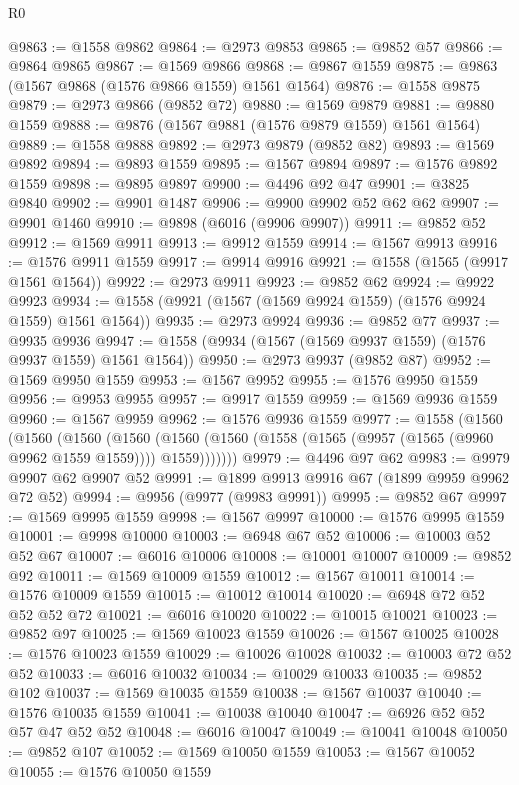 \begin{lexlean}{R0}
\begin{coremodule}
@9863 := @1558 @9862
@9864 := @2973 @9853
@9865 := @9852 @57
@9866 := @9864 @9865
@9867 := @1569 @9866
@9868 := @9867 @1559
@9875 := @9863 (@1567 @9868 (@1576 @9866 @1559) @1561 @1564)
@9876 := @1558 @9875
@9879 := @2973 @9866 (@9852 @72)
@9880 := @1569 @9879
@9881 := @9880 @1559
@9888 := @9876 (@1567 @9881 (@1576 @9879 @1559) @1561 @1564)
@9889 := @1558 @9888
@9892 := @2973 @9879 (@9852 @82)
@9893 := @1569 @9892
@9894 := @9893 @1559
@9895 := @1567 @9894
@9897 := @1576 @9892 @1559
@9898 := @9895 @9897
@9900 := @4496 @92 @47
@9901 := @3825 @9840
@9902 := @9901 @1487
@9906 := @9900 @9902 @52 @62 @62
@9907 := @9901 @1460
@9910 := @9898 (@6016 (@9906 @9907))
@9911 := @9852 @52
@9912 := @1569 @9911
@9913 := @9912 @1559
@9914 := @1567 @9913
@9916 := @1576 @9911 @1559
@9917 := @9914 @9916
@9921 := @1558 (@1565 (@9917 @1561 @1564))
@9922 := @2973 @9911
@9923 := @9852 @62
@9924 := @9922 @9923
@9934 := @1558 (@9921 (@1567 (@1569 @9924 @1559) (@1576 @9924 @1559) @1561 @1564))
@9935 := @2973 @9924
@9936 := @9852 @77
@9937 := @9935 @9936
@9947 := @1558 (@9934 (@1567 (@1569 @9937 @1559) (@1576 @9937 @1559) @1561 @1564))
@9950 := @2973 @9937 (@9852 @87)
@9952 := @1569 @9950 @1559
@9953 := @1567 @9952
@9955 := @1576 @9950 @1559
@9956 := @9953 @9955
@9957 := @9917 @1559
@9959 := @1569 @9936 @1559
@9960 := @1567 @9959
@9962 := @1576 @9936 @1559
@9977 := @1558
    (@1560
      (@1560
        (@1560
          (@1560 (@1560 (@1560 (@1558 (@1565 (@9957 (@1565 (@9960 @9962 @1559 @1559)))) @1559)))))))
@9979 := @4496 @97 @62
@9983 := @9979 @9907 @62 @9907 @52
@9991 := @1899 @9913 @9916 @67 (@1899 @9959 @9962 @72 @52)
@9994 := @9956 (@9977 (@9983 @9991))
@9995 := @9852 @67
@9997 := @1569 @9995 @1559
@9998 := @1567 @9997
@10000 := @1576 @9995 @1559
@10001 := @9998 @10000
@10003 := @6948 @67 @52
@10006 := @10003 @52 @52 @67
@10007 := @6016 @10006
@10008 := @10001 @10007
@10009 := @9852 @92
@10011 := @1569 @10009 @1559
@10012 := @1567 @10011
@10014 := @1576 @10009 @1559
@10015 := @10012 @10014
@10020 := @6948 @72 @52 @52 @52 @72
@10021 := @6016 @10020
@10022 := @10015 @10021
@10023 := @9852 @97
@10025 := @1569 @10023 @1559
@10026 := @1567 @10025
@10028 := @1576 @10023 @1559
@10029 := @10026 @10028
@10032 := @10003 @72 @52 @52
@10033 := @6016 @10032
@10034 := @10029 @10033
@10035 := @9852 @102
@10037 := @1569 @10035 @1559
@10038 := @1567 @10037
@10040 := @1576 @10035 @1559
@10041 := @10038 @10040
@10047 := @6926 @52 @52 @57 @47 @52 @52
@10048 := @6016 @10047
@10049 := @10041 @10048
@10050 := @9852 @107
@10052 := @1569 @10050 @1559
@10053 := @1567 @10052
@10055 := @1576 @10050 @1559

\end{coremodule}
\end{lexlean}

